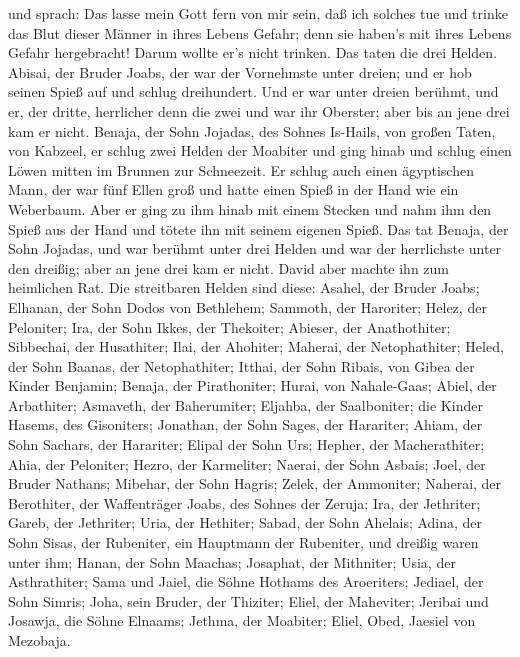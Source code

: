  und sprach: Das lasse mein Gott fern von mir sein, daß ich
solches tue und trinke das Blut dieser Männer in ihres Lebens Gefahr;
denn sie haben's mit ihres Lebens Gefahr hergebracht! Darum wollte er's
nicht trinken. Das taten die drei Helden.  Abisai, der
Bruder Joabs, der war der Vornehmste unter dreien; und er hob seinen
Spieß auf und schlug dreihundert. Und er war unter dreien berühmt,
 und er, der dritte, herrlicher denn die zwei und war ihr
Oberster; aber bis an jene drei kam er nicht.  Benaja, der
Sohn Jojadas, des Sohnes Is-Hails, von großen Taten, von Kabzeel, er
schlug zwei Helden der Moabiter und ging hinab und schlug einen Löwen
mitten im Brunnen zur Schneezeit.  Er schlug auch einen
ägyptischen Mann, der war fünf Ellen groß und hatte einen Spieß in der
Hand wie ein Weberbaum. Aber er ging zu ihm hinab mit einem Stecken und
nahm ihm den Spieß aus der Hand und tötete ihn mit seinem eigenen Spieß.
 Das tat Benaja, der Sohn Jojadas, und war berühmt unter
drei Helden  und war der herrlichste unter den dreißig;
aber an jene drei kam er nicht. David aber machte ihn zum heimlichen
Rat.  Die streitbaren Helden sind diese: Asahel, der Bruder
Joabs; Elhanan, der Sohn Dodos von Bethlehem;  Sammoth, der
Haroriter; Helez, der Peloniter;  Ira, der Sohn Ikkes, der
Thekoiter; Abieser, der Anathothiter;  Sibbechai, der
Husathiter; Ilai, der Ahohiter;  Maherai, der
Netophathiter; Heled, der Sohn Baanas, der Netophathiter; 
Itthai, der Sohn Ribais, von Gibea der Kinder Benjamin; Benaja, der
Pirathoniter;  Hurai, von Nahale-Gaas; Abiel, der
Arbathiter;  Asmaveth, der Baherumiter; Eljahba, der
Saalboniter;  die Kinder Hasems, des Gisoniters; Jonathan,
der Sohn Sages, der Harariter;  Ahiam, der Sohn Sachars,
der Harariter; Elipal der Sohn Urs;  Hepher, der
Macherathiter; Ahia, der Peloniter;  Hezro, der Karmeliter;
Naerai, der Sohn Asbais;  Joel, der Bruder Nathans;
Mibehar, der Sohn Hagris;  Zelek, der Ammoniter; Naherai,
der Berothiter, der Waffenträger Joabs, des Sohnes der Zeruja;
 Ira, der Jethriter; Gareb, der Jethriter; 
Uria, der Hethiter; Sabad, der Sohn Ahelais;  Adina, der
Sohn Sisas, der Rubeniter, ein Hauptmann der Rubeniter, und dreißig
waren unter ihm;  Hanan, der Sohn Maachas; Josaphat, der
Mithniter;  Usia, der Asthrathiter; Sama und Jaiel, die
Söhne Hothams des Aroeriters;  Jediael, der Sohn Simris;
Joha, sein Bruder, der Thiziter;  Eliel, der Maheviter;
Jeribai und Josawja, die Söhne Elnaams; Jethma, der Moabiter;
 Eliel, Obed, Jaesiel von Mezobaja.

